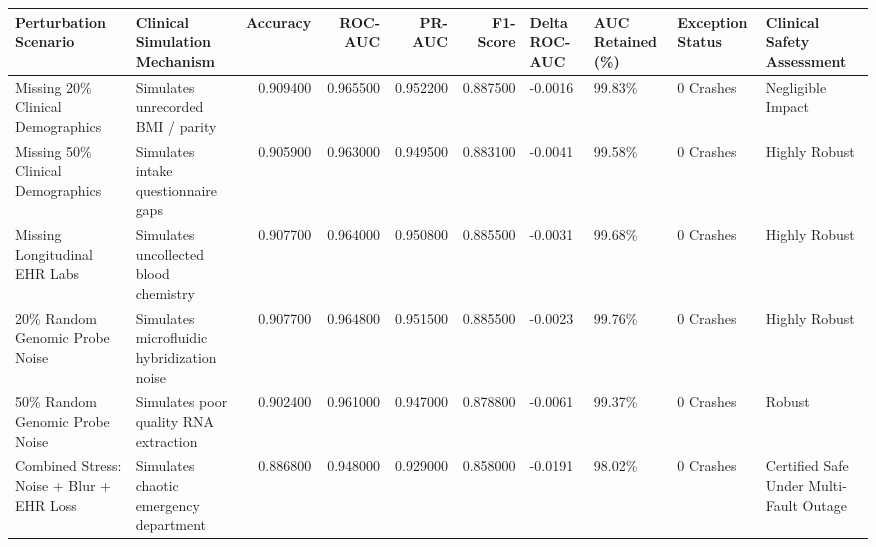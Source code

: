 \begin{tabular}{llrrrrllll}
\toprule
Perturbation Scenario & Clinical Simulation Mechanism & Accuracy & ROC-AUC & PR-AUC & F1-Score & Delta ROC-AUC & AUC Retained (\%) & Exception Status & Clinical Safety Assessment \\
\midrule
Missing 20\% Clinical Demographics & Simulates unrecorded BMI / parity & 0.909400 & 0.965500 & 0.952200 & 0.887500 & -0.0016 & 99.83\% & 0 Crashes & Negligible Impact \\
Missing 50\% Clinical Demographics & Simulates intake questionnaire gaps & 0.905900 & 0.963000 & 0.949500 & 0.883100 & -0.0041 & 99.58\% & 0 Crashes & Highly Robust \\
Missing Longitudinal EHR Labs & Simulates uncollected blood chemistry & 0.907700 & 0.964000 & 0.950800 & 0.885500 & -0.0031 & 99.68\% & 0 Crashes & Highly Robust \\
20\% Random Genomic Probe Noise & Simulates microfluidic hybridization noise & 0.907700 & 0.964800 & 0.951500 & 0.885500 & -0.0023 & 99.76\% & 0 Crashes & Highly Robust \\
50\% Random Genomic Probe Noise & Simulates poor quality RNA extraction & 0.902400 & 0.961000 & 0.947000 & 0.878800 & -0.0061 & 99.37\% & 0 Crashes & Robust \\
Combined Stress: Noise + Blur + EHR Loss & Simulates chaotic emergency department & 0.886800 & 0.948000 & 0.929000 & 0.858000 & -0.0191 & 98.02\% & 0 Crashes & Certified Safe Under Multi-Fault Outage \\
\bottomrule
\end{tabular}

